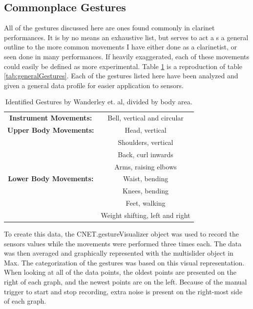 \subsection{Commonplace Gestures}
All of the gestures discussed here are ones found commonly in clarinet performances. It is by no means an exhaustive list, but serves to act a s a general outline to the more common movements I have either done as a clarinetist, or seen done in many performances. If heavily exaggerated, each of these movements could easily be defined as more experimental. Table \ref{tab:generalGestures2} is a reproduction of table \ref{tab:generalGestures}. Each of the gestures listed here have been analyzed and given a general data profile for easier application to sensors.


\begin{table}[]
    \centering
    \begin{tabular}{|c||c|}
    \hline
       \textbf{Instrument Movements:}  & Bell, vertical and circular \\
        \textbf{Upper Body Movements:} & Head, vertical \\
        & Shoulders, vertical \\
        & Back, curl inwards \\
        & Arms, raising elbows \\
       \textbf{ Lower Body Movements:} & Waist, bending \\
        & Knees, bending \\
        & Feet, walking \\
        & Weight shifting, left and right\\
        \hline
    \end{tabular}
    \caption{Identified Gestures by Wanderley et. al\cite{wanderleyClarinetGesture2005}, divided by body area.}
    \label{tab:generalGestures2}
\end{table}

To create this data, the CNET.gestureVisualizer object was used to record the sensors values while the movements were performed three times each. The data was then averaged and graphically represented with the multislider object in Max. The categorization of the gestures was based on this visual representation. When looking at all of the data points, the oldest points are presented on the right of each graph, and the newest points are on the left. Because of the manual trigger to start and stop recording, extra noise is present on the right-most side of each graph. 

